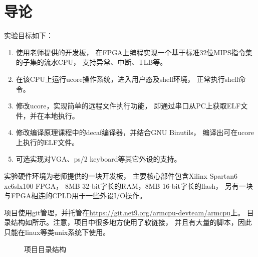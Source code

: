 
\section{导论}
实验目标如下：
\begin{enumerate}
	\item 使用老师提供的开发板，
		在FPGA上编程实现一个基于标准32位MIPS指令集的子集的流水CPU，
		支持异常、中断、TLB等。
	\item 在该CPU上运行ucore操作系统，进入用户态及shell环境，
		正常执行shell命令。
	\item 修改ucore，实现简单的远程文件执行功能，
		即通过串口从PC上获取ELF文件，并在本地执行。
	\item 修改编译原理课程中的decaf编译器，并结合GNU Binutils，
		编译出可在ucore上执行的ELF文件。
	\item 可选实现对VGA、ps/2 keyboard等其它外设的支持。
\end{enumerate}

实验硬件环境为老师提供的一块开发板，
主要核心部件包含Xilinx Spartan6 xc6slx100 FPGA，
8MB 32-bit字长的RAM，8MB 16-bit字长的flash，
另有一块与FPGA相连的CPLD用于一些外设I/O操作。

项目使用git管理，并托管在\url{https://git.net9.org/armcpu-devteam/armcpu}上。
目录结构如所示。注意，项目中很多地方使用了软链接，
并且有大量的脚本，因此只能在linux等类unix系统下使用。

\begin{figure}[!ht]
\caption{\label{fig:dirtree}项目目录结构}
\end{figure}


